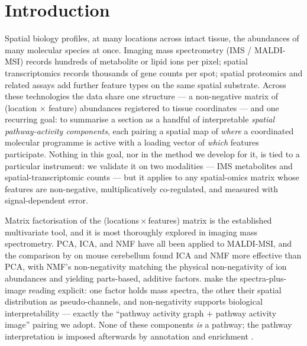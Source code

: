 \documentclass[11pt]{article}
\begin{document}
\section{Introduction}
\label{sec:intro}

Spatial biology profiles, at many locations across intact tissue, the abundances of many
molecular species at once. Imaging mass spectrometry (IMS / MALDI-MSI) records hundreds of
metabolite or lipid ions per pixel; spatial transcriptomics records thousands of gene counts
per spot; spatial proteomics and related assays add further feature types on the same
spatial substrate. Across these technologies the data share one structure --- a non-negative
matrix of (location $\times$ feature) abundances registered to tissue coordinates --- and one
recurring goal: to summarise a section as a handful of interpretable \emph{spatial
pathway-activity components}, each pairing a spatial map of \emph{where} a coordinated
molecular programme is active with a loading vector of \emph{which} features participate.
Nothing in this goal, nor in the method we develop for it, is tied to a particular
instrument: we validate it on two modalities --- IMS metabolites and spatial-transcriptomic
counts --- but it applies to any spatial-omics matrix whose features are non-negative,
multiplicatively co-regulated, and measured with signal-dependent error.

Matrix factorisation of the (locations\,$\times$\,features) matrix is the established
multivariate tool, and it is most thoroughly explored in imaging mass spectrometry. PCA,
ICA, and NMF have all been applied to MALDI-MSI,
and the comparison by \citet{siy2007} on mouse cerebellum found ICA and NMF more effective
than PCA, with NMF's non-negativity matching the physical non-negativity of ion abundances
and yielding parts-based, additive factors. \citet{leuschner2019} make the
spectra-plus-image reading explicit: one factor holds mass spectra, the other their spatial
distribution as pseudo-channels, and non-negativity supports biological interpretability
--- exactly the ``pathway activity graph $+$ pathway activity image'' pairing we adopt.
None of these components \emph{is} a pathway; the pathway interpretation is imposed
afterwards by annotation and enrichment \citep{jones2014,wittmann2025}.
\end{document}
